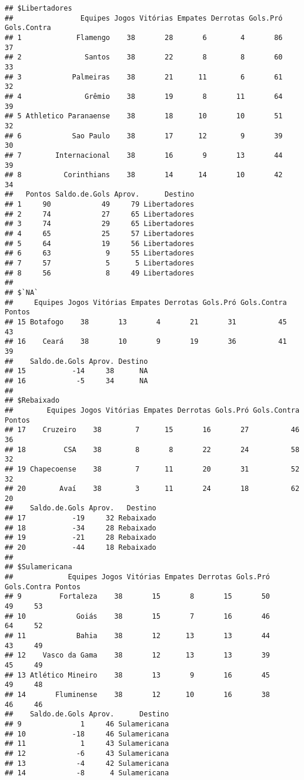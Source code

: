 \documentclass[
]{book}
\begin{document}
\begin{verbatim}
## $Libertadores
##                Equipes Jogos Vitórias Empates Derrotas Gols.Pró Gols.Contra
## 1             Flamengo    38       28       6        4       86          37
## 2               Santos    38       22       8        8       60          33
## 3            Palmeiras    38       21      11        6       61          32
## 4               Grêmio    38       19       8       11       64          39
## 5 Athletico Paranaense    38       18      10       10       51          32
## 6            Sao Paulo    38       17      12        9       39          30
## 7        Internacional    38       16       9       13       44          39
## 8          Corinthians    38       14      14       10       42          34
##   Pontos Saldo.de.Gols Aprov.      Destino
## 1     90            49     79 Libertadores
## 2     74            27     65 Libertadores
## 3     74            29     65 Libertadores
## 4     65            25     57 Libertadores
## 5     64            19     56 Libertadores
## 6     63             9     55 Libertadores
## 7     57             5      5 Libertadores
## 8     56             8     49 Libertadores
## 
## $`NA`
##     Equipes Jogos Vitórias Empates Derrotas Gols.Pró Gols.Contra Pontos
## 15 Botafogo    38       13       4       21       31          45     43
## 16    Ceará    38       10       9       19       36          41     39
##    Saldo.de.Gols Aprov. Destino
## 15           -14     38      NA
## 16            -5     34      NA
## 
## $Rebaixado
##        Equipes Jogos Vitórias Empates Derrotas Gols.Pró Gols.Contra Pontos
## 17    Cruzeiro    38        7      15       16       27          46     36
## 18         CSA    38        8       8       22       24          58     32
## 19 Chapecoense    38        7      11       20       31          52     32
## 20        Avaí    38        3      11       24       18          62     20
##    Saldo.de.Gols Aprov.   Destino
## 17           -19     32 Rebaixado
## 18           -34     28 Rebaixado
## 19           -21     28 Rebaixado
## 20           -44     18 Rebaixado
## 
## $Sulamericana
##             Equipes Jogos Vitórias Empates Derrotas Gols.Pró Gols.Contra Pontos
## 9         Fortaleza    38       15       8       15       50          49     53
## 10            Goiás    38       15       7       16       46          64     52
## 11            Bahia    38       12      13       13       44          43     49
## 12    Vasco da Gama    38       12      13       13       39          45     49
## 13 Atlético Mineiro    38       13       9       16       45          49     48
## 14       Fluminense    38       12      10       16       38          46     46
##    Saldo.de.Gols Aprov.      Destino
## 9              1     46 Sulamericana
## 10           -18     46 Sulamericana
## 11             1     43 Sulamericana
## 12            -6     43 Sulamericana
## 13            -4     42 Sulamericana
## 14            -8      4 Sulamericana
\end{verbatim}
\end{document}
